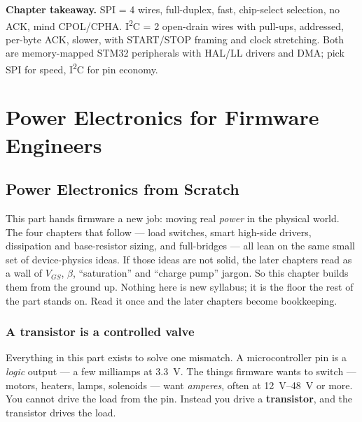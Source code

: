 \documentclass[11pt,a4paper,oneside]{book}
\begin{document}
\begin{keyidea}
\textbf{Chapter takeaway.} SPI = 4 wires, full-duplex, fast, chip-select
selection, no ACK, mind CPOL/CPHA. I\textsuperscript{2}C = 2 open-drain wires
with pull-ups, addressed, per-byte ACK, slower, with START/STOP framing and clock
stretching. Both are memory-mapped STM32 peripherals with HAL/LL drivers and DMA;
pick SPI for speed, I\textsuperscript{2}C for pin economy.
\end{keyidea}

\part{Power Electronics for Firmware Engineers}
\label{part:power}

\chapter{Power Electronics from Scratch}
\label{ch:power-primer}

This part hands firmware a new job: moving real \emph{power} in the physical world.
The four chapters that follow --- load switches, smart high-side drivers, dissipation
and base-resistor sizing, and full-bridges --- all lean on the same small set of
device-physics ideas. If those ideas are not solid, the later chapters read as a wall
of $V_{GS}$, $\beta$, ``saturation'' and ``charge pump'' jargon. So this chapter builds
them from the ground up. Nothing here is new syllabus; it is the floor the rest of the
part stands on. Read it once and the later chapters become bookkeeping.

\section{A transistor is a controlled valve}
Everything in this part exists to solve one mismatch. A microcontroller pin is a
\emph{logic} output --- a few milliamps at \qty{3.3}{\volt}. The things firmware wants to
switch --- motors, heaters, lamps, solenoids --- want \emph{amperes}, often at
\qtyrange{12}{48}{\volt} or more. You cannot drive the load from the pin. Instead you
drive a \textbf{transistor}, and the transistor drives the load.
\end{document}
